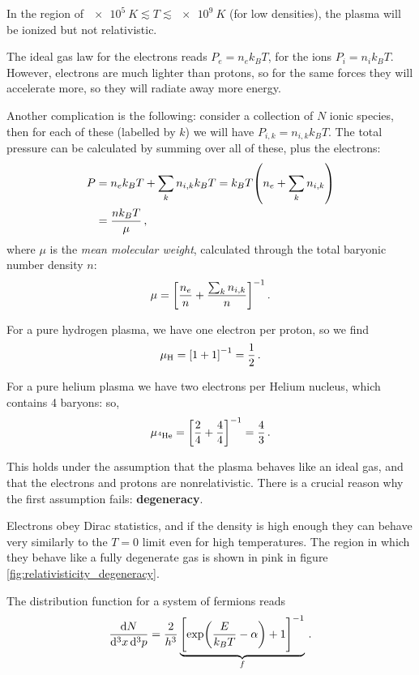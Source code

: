 \documentclass[main.tex]{subfiles}
\begin{document}
In the region of \(\SI{e5}{K} \lesssim T \lesssim \SI{e9}{K}\) (for low densities), the plasma will be ionized but not relativistic. 

The ideal gas law for the electrons reads \(P_e = n_e k_B T\), for the ions \(P_i = n_i k_B T\). 
However, electrons are much lighter than protons, so for the same forces they will accelerate more, so they will radiate away more energy. 

Another complication is the following: consider a collection of \(N\) ionic species, then for each of these (labelled by \(k\)) we will have \(P_{i, k}= n_{i, k} k_B T\). 
The total pressure can be calculated by summing over all of these, plus the electrons: 
%
\begin{align}
P &= n_e k_B T + \sum _{k} n_{i, k} k_B T = k_B T \qty(n_e + \sum_k n_{i, k})  \\
&= \frac{nk_B T}{\mu }
\,,
\end{align}
%
where \(\mu \) is the \emph{mean molecular weight}, calculated through the total baryonic number density \(n\): 
%
\begin{align}
\mu = \qty[\frac{n_e}{n} + \frac{\sum _{k} n_{i, k}}{n} ]^{-1}
\,.
\end{align}

For a pure hydrogen plasma, we have one electron per proton, so we find 
%
\begin{align}
\mu_{\ce{H}} = \qty[1 + 1]^{-1} = \frac{1}{2}
\,.
\end{align}

For a pure helium plasma we have two electrons per Helium nucleus, which contains 4 baryons: so, 
%
\begin{align}
\mu_{\ce{^{4}He}} = \qty[ \frac{2}{4} + \frac{4}{4}]^{-1} = \frac{4}{3}
\,.
\end{align}

This holds under the assumption that the plasma behaves like an ideal gas, and that the electrons and protons are nonrelativistic. 
There is a crucial reason why the first assumption fails: \textbf{degeneracy}.

Electrons obey Dirac statistics, and if the density is high enough they can behave very similarly to the \(T = 0\) limit even for high temperatures. The region in which they behave like a fully degenerate gas is shown in pink in figure \ref{fig:relativisticity_degeneracy}. 

The distribution function for a system of fermions reads 
%
\begin{align}
\frac{ \dd{N}}{ \dd[3]{x} \dd[3]{p}} = \frac{2}{h^3} \underbrace{\qty[\exp(\frac{E }{k_B T} - \alpha ) + 1]^{-1}}_{f}
\,.
\end{align}
\end{document}
